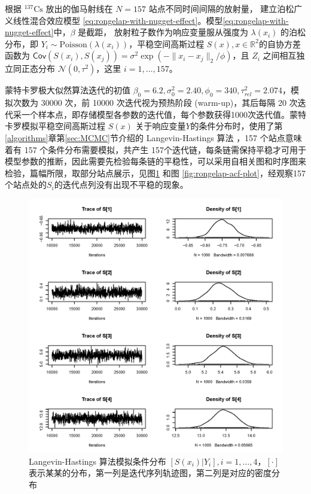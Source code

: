 \documentclass[12pt,a4paper,UTF8,twoside]{book}
\theoremstyle{definition}
\theoremstyle{definition}
\theoremstyle{definition}
\theoremstyle{remark}
\begin{document}
根据 \({}^{137}\mathrm{Cs}\) 放出的伽马射线在 \(N=157\)
站点不同时间间隔的放射量， 建立泊松广义线性混合效应模型
\eqref{eq:rongelap-with-nugget-effect}。模型\eqref{eq:rongelap-with-nugget-effect}中，\(\beta\)
是截距， 放射粒子数作为响应变量服从强度为 \(\lambda(x_i)\)
的泊松分布，即
\(Y_{i} \sim \mathrm{Poisson}( \lambda(x_i) )\)，平稳空间高斯过程
\(S(x),x \in \mathbb{R}^2\)的自协方差函数为
\(\mathsf{Cov}( S(x_i), S(x_j) ) = \sigma^2 \exp( -\|x_i -x_j\|_{2} / \phi )\)，且
\(Z_i\) 之间相互独立同正态分布 \(\mathcal{N}(0,\tau^2)\)，这里
\(i = 1,\ldots, 157\)。

蒙特卡罗极大似然算法迭代的初值
\(\beta_{0} = 6.2,\sigma^2_{0} = 2.40,\phi_{0} = 340,\tau^2_{rel} = 2.074\)，模拟次数为
30000 次，前 10000 次迭代视为预热阶段 (warm-up)，其后每隔 20
次迭代采一个样本点，即存储模型各参数的迭代值，每个参数获得1000次迭代值。蒙特卡罗模拟平稳空间高斯过程
\(S(x)\)
关于响应变量\(Y\)的条件分布时，使用了第\ref{algorithms}章第\ref{sec:MCMC}节介绍的
Langevin-Hastings 算法 \citep{Omiros2003}，157 个站点意味着有 157
个条件分布需要模拟，共产生
157个迭代链，每条链需保持平稳才可用于模型参数的推断，因此需要先检验每条链的平稳性，可以采用自相关图和时序图来检验，篇幅所限，取部分站点展示，见图\ref{fig:rongelap-trace-plot}
和图
\ref{fig:rongelap-acf-plot}，经观察157个站点处的\(S_i\)的迭代点列没有出现不平稳的现象。

\begin{figure}

{\centering \includegraphics[width=0.7\linewidth]{figures/rongelap-mcml-diagnosis-trace-9} 

}

\caption{Langevin-Hastings 算法模拟条件分布
\([S(x_{i})|Y_{i}], i = 1,\ldots,4\)，\([\cdot]\)
表示某某的分布，第一列是迭代序列轨迹图，第二列是对应的密度分布}\label{fig:rongelap-trace-plot}
\end{figure}
\end{document}
